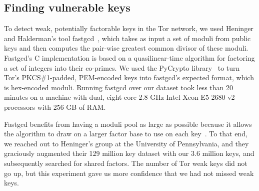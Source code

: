 \subsection{Finding vulnerable keys}
\label{sec:vulnerable-keys}
To detect weak, potentially factorable keys in the Tor network, we used Heninger
and Halderman's tool fastgcd~\cite{fastgcd}, which takes as input a set
of moduli from public keys and then computes the pair-wise greatest common
divisor of these moduli.  Fastgcd's C implementation is based on a
quasilinear-time algorithm for factoring a set of integers into their co-primes.
We used the PyCrypto library~\cite{pycrypto} to turn Tor's PKCS\#1-padded,
PEM-encoded keys into fastgcd's expected format, which is hex-encoded
moduli.  Running fastgcd over our dataset took less than 20 minutes on
a machine with dual, eight-core 2.8 GHz Intel Xeon E5 2680 v2 processors with
256 GB of RAM.

Fastgcd benefits from having a moduli pool as large as possible
because it allows the algorithm to draw on a larger factor base to use on each
key~\cite{Heninger2012a}.  To that end, we reached out to Heninger's group at
the University of Pennsylvania, and they graciously augmented their 129 million
key dataset with our 3.6 million keys, and subsequently searched for shared
factors.  The number of Tor weak keys did not go up, but this experiment gave us
more confidence that we had not missed weak keys.
